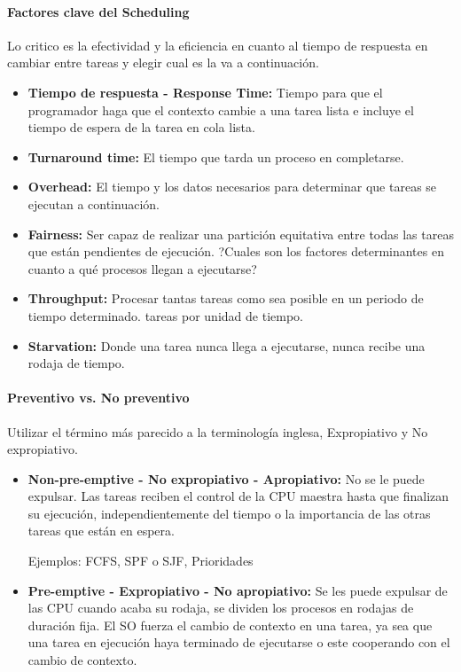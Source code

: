 \documentclass[12pt]{report} %
\begin{document}
\begin{description}
	\paragraph{Factores clave del Scheduling}
	Lo critico es la efectividad y la eficiencia en cuanto al tiempo de respuesta en cambiar entre tareas y elegir cual es la va a continuación.
	\begin{itemize}
		\item 	\textbf{Tiempo de respuesta - Response Time:} Tiempo para que el programador haga que el contexto cambie a una tarea lista e incluye el tiempo de espera de la tarea en cola lista.
		\item 	\textbf{Turnaround time:} El tiempo que tarda un proceso en completarse.
		\item 	\textbf{Overhead:} El tiempo y los datos necesarios para determinar que tareas se ejecutan a continuación.
		\item 	\textbf{Fairness:} Ser capaz de realizar una partición equitativa entre todas las tareas que están pendientes de ejecución. ?Cuales son los factores determinantes en cuanto a qué procesos llegan a ejecutarse?
		\item 	\textbf{Throughput:} Procesar tantas tareas como sea posible en un periodo de tiempo determinado. tareas por unidad de tiempo.
		\item 	\textbf{Starvation:} Donde una tarea nunca llega a ejecutarse, nunca recibe una rodaja de tiempo.
	\end{itemize}

	
	\paragraph{Preventivo vs. No preventivo}

	Utilizar el término más parecido a la terminología inglesa, Expropiativo y No expropiativo.

	\begin{itemize}
		\item \textbf{Non-pre-emptive - No expropiativo - Apropiativo:} No se le puede expulsar. Las tareas reciben el control de la CPU maestra hasta que finalizan su ejecución, independientemente del tiempo o la importancia de las otras tareas que están en espera.
		
		Ejemplos: FCFS, SPF o SJF, Prioridades

		\item \textbf{Pre-emptive - Expropiativo - No apropiativo:} Se les puede expulsar de las CPU cuando acaba su rodaja, se dividen los procesos en rodajas de duración fija. El SO fuerza el cambio de contexto en una tarea, ya sea que una tarea en ejecución haya terminado de ejecutarse o este cooperando con el cambio de contexto.	


\end{itemize}
\end{description}
\end{document}
